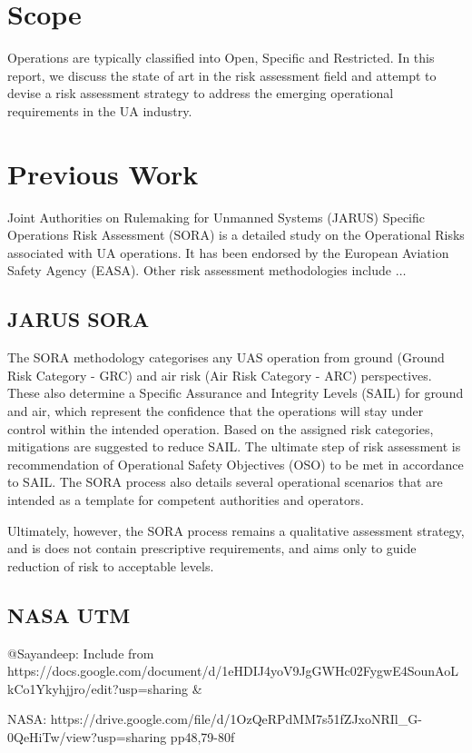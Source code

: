 \documentclass{ua_wgs_base}
\begin{document}
\section{Scope}

Operations are typically classified into Open, Specific and Restricted.
In this report, we discuss the state of art in the risk assessment
field and attempt to devise a risk assessment strategy to address
the emerging operational requirements in the UA industry.

\section{Previous Work}

Joint Authorities on Rulemaking for Unmanned Systems (JARUS) Specific
Operations Risk Assessment (SORA) \cite{JARUS-SORA/JAR-DEL-WG6-D.04}
is a detailed study on the Operational Risks associated with UA operations.
It has been endorsed by the European Aviation Safety Agency (EASA).
Other risk assessment methodologies include $\ldots$

\subsection{JARUS SORA}

The SORA methodology categorises any UAS operation from ground (Ground
Risk Category - GRC) and air risk (Air Risk Category - ARC) perspectives.
These also determine a Specific Assurance and Integrity Levels (SAIL)
for ground and air, which represent the confidence that the operations
will stay under control within the intended operation. Based on the
assigned risk categories, mitigations are suggested to reduce SAIL.
The ultimate step of risk assessment is recommendation of Operational
Safety Objectives (OSO) to be met in accordance to SAIL. The SORA
process also details several operational scenarios that are intended
as a template for competent authorities and operators. 

Ultimately, however, the SORA process remains a qualitative assessment
strategy, and is does not contain prescriptive requirements, and aims
only to guide reduction of risk to acceptable levels.

\subsection{NASA UTM}

\begin{lyxgreyedout}
@Sayandeep: Include from https://docs.google.com/document/d/1eHDIJ4yoV9JgGWHc02FygwE4SounAoLkCo1Ykyhjjro/edit?usp=sharing
\&

NASA: https://drive.google.com/file/d/1OzQeRPdMM7s51fZJxoNRIl\_G-0QeHiTw/view?usp=sharing
pp48,79-80f%
\end{lyxgreyedout}
\end{document}
